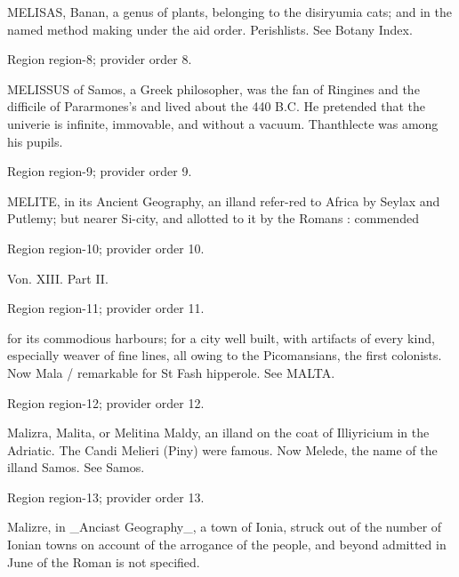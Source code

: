 \documentclass[11pt]{article}
\begin{document}
MELISAS, Banan, a genus of plants, belonging to the disiryumia cats; and in the named method making under the aid order. Perishlists. See Botany Index.
\par

{\scriptsize\color{gray} Region region-8; provider order 8.\par}
\medskip

MELISSUS of Samos, a Greek philosopher, was the fan of Ringines and the difficile of Pararmones’s and lived about the 440 B.C. He pretended that the univerie is infinite, immovable, and without a vacuum. Thanthlecte was among his pupils.
\par

{\scriptsize\color{gray} Region region-9; provider order 9.\par}
\medskip

MELITE, in its Ancient Geography, an illand refer-red to Africa by Seylax and Putlemy; but nearer Si-city, and allotted to it by the Romans : commended
\par

{\scriptsize\color{gray} Region region-10; provider order 10.\par}
\medskip

Von. XIII. Part II.
\par

{\scriptsize\color{gray} Region region-11; provider order 11.\par}
\medskip

for its commodious harbours; for a city well built, with artifacts of every kind, especially weaver of fine lines, all owing to the Picomansians, the first colonists. Now Mala / remarkable for St Fash hipperole. See MALTA.
\par

{\scriptsize\color{gray} Region region-12; provider order 12.\par}
\medskip

Malizra, Malita, or Melitina Maldy, an illand on the coat of Illiyricium in the Adriatic. The Candi Melieri (Piny) were famous. Now Melede, the name of the illand Samos. See Samos.
\par

{\scriptsize\color{gray} Region region-13; provider order 13.\par}
\medskip

Malizre, in \_Anciast Geography\_, a town of Ionia, struck out of the number of Ionian towns on account of the arrogance of the people, and beyond admitted in June of the Roman is not specified.
\par
\end{document}
